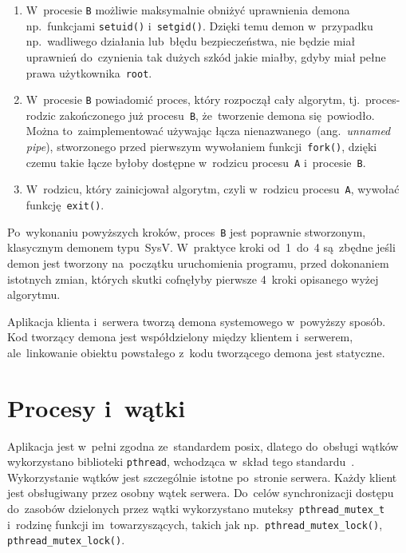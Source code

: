 \documentclass[thesis]{subfiles}
\begin{document}
\begin{enumerate}
	\item W~procesie \texttt{B} możliwie maksymalnie obniżyć uprawnienia demona np.~funkcjami \texttt{setuid()} i~\texttt{setgid()}. Dzięki temu demon w~przypadku np.~wadliwego działania lub~błędu bezpieczeństwa, nie będzie miał uprawnień do~czynienia tak dużych szkód jakie miałby, gdyby miał pełne prawa użytkownika~\texttt{root}.
	\item W~procesie \texttt{B} powiadomić proces, który rozpoczął cały algorytm, tj.~proces-rodzic zakończonego już procesu~\texttt{B}, że~tworzenie demona się~powiodło. Można to~zaimplementować używając łącza nienazwanego~(ang.~\emph{unnamed pipe}), stworzonego przed pierwszym wywołaniem funkcji~\texttt{fork()}, dzięki czemu takie łącze byłoby dostępne w~rodzicu procesu~\texttt{A} i~procesie~\texttt{B}.
	\item W~rodzicu, który zainicjował algorytm, czyli w~rodzicu procesu~\texttt{A}, wywołać funkcję~\texttt{exit()}.
\end{enumerate}
Po~wykonaniu powyższych kroków, proces~\texttt{B} jest poprawnie stworzonym, klasycznym demonem typu~SysV. W~praktyce kroki od~1~do~4 są~zbędne jeśli demon jest tworzony na~początku uruchomienia programu, przed dokonaniem istotnych zmian, których skutki cofnęłyby pierwsze 4~kroki opisanego wyżej algorytmu.

Aplikacja klienta i~serwera tworzą demona systemowego w~powyższy sposób. Kod tworzący demona jest współdzielony między klientem i~serwerem, ale~linkowanie obiektu powstałego z~kodu tworzącego demona jest statyczne.


\section{Procesy i~wątki}

Aplikacja jest w~pełni zgodna ze~standardem \gls{posix}, dlatego do~obsługi wątków wykorzystano biblioteki \texttt{pthread}, wchodząca w~skład tego standardu~\cite{pthreads-posix-manual}. Wykorzystanie wątków jest szczególnie istotne po~stronie serwera. Każdy klient jest obsługiwany przez osobny wątek serwera. Do~celów synchronizacji dostępu do~zasobów dzielonych przez wątki wykorzystano muteksy~\texttt{pthread\_mutex\_t} i~rodzinę funkcji im~towarzyszących, takich jak np.~\texttt{pthread\_mutex\_lock()}, \texttt{pthread\_mutex\_lock()}.

\end{document}
